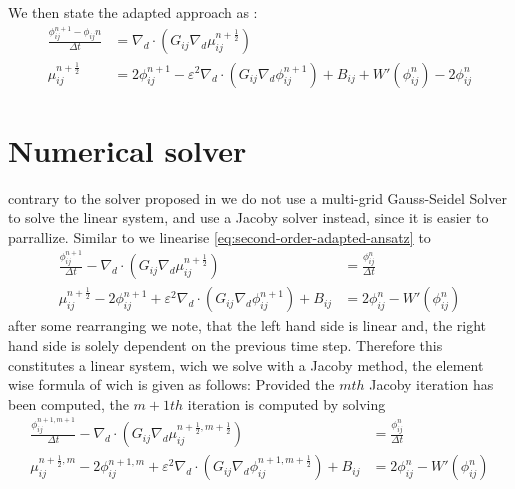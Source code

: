 \documentclass{mimosis}
\begin{document}
We then state the adapted approach as :
\begin{equation}
\label{eq:second-order-adapted-ansatz}
\begin{aligned}
\frac{\phi_{ij}^{n+1} - \phi_{ij}n}{\Delta t}  &=  \nabla _d \cdot (G_{ij} \nabla_d \mu_{ij}^{n+\frac{1}{2}} )  \\
 \mu_{ij}^{n+\frac{1}{2}} &= 2\phi_{ij}^{n+1} - \varepsilon^2  \nabla_d \cdot  (G_{ij} \nabla _d \phi_{ij}^{n+1} ) + B_{ij} + W'(\phi_{ij}^n) - 2\phi _{ij}^n
\end{aligned}
\end{equation}
\chapter{Numerical solver}
\label{sec:org60b5500}
contrary to the solver proposed in\autocite{Ulmer_CHRelaxed_2024} we do not use a multi-grid Gauss-Seidel Solver to solve the linear system, and use a Jacoby solver instead, since it is easier to parrallize.
Similar to \autocite{Ulmer_CHRelaxed_2024} we linearise \eqref{eq:second-order-adapted-ansatz} to
\begin{equation}
\begin{aligned}
\frac{\phi_{ij}^{n+1}}{\Delta t}  -  \nabla _d \cdot (G_{ij} \nabla_d \mu_{ij}^{n+\frac{1}{2}} ) &= \frac{ \phi_{ij}^n}{\Delta t}  \\
 \mu_{ij}^{n+\frac{1}{2}} - 2\phi_{ij}^{n+1} + \varepsilon^2  \nabla_d \cdot  (G_{ij} \nabla _d \phi_{ij}^{n+1} ) + B_{ij} &=2\phi _{ij}^n - W'(\phi_{ij}^n)
\end{aligned}
\end{equation}
after some rearranging we note, that the left hand side is linear and, the right hand side is solely dependent on the previous time step. Therefore this constitutes a linear system, wich we solve with a Jacoby method, the element wise formula of wich is given as follows:
Provided the \(mth\) Jacoby iteration has been computed, the \(m+1th\) iteration is computed by solving
\begin{equation}
\begin{aligned}
\frac{\phi_{ij}^{n+1,m+1}}{\Delta t}  -  \nabla _d \cdot (G_{ij} \nabla_d \mu_{ij}^{n+\frac{1}{2},m+\frac{1}{2}} ) &= \frac{ \phi_{ij}^{n}}{\Delta t}  \\
 \mu_{ij}^{n+\frac{1}{2},m} - 2\phi_{ij}^{n+1,m} + \varepsilon^2  \nabla_d \cdot  (G_{ij} \nabla _d \phi_{ij}^{n+1,m+\frac{1}{2}} ) + B_{ij} &=2\phi _{ij}^n - W'(\phi_{ij}^n)
\end{aligned}
\end{equation}
\end{document}
